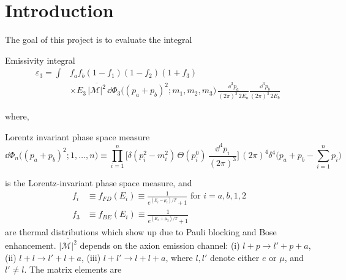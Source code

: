 \section{Introduction}
\label{sec:introduction}
The goal of this project is to evaluate the integral 

\begin{bluenv}{Emissivity integral}
    \begin{equation}
    \label{eq:emissivity-integral}
    \begin{aligned}
        \varepsilon_3 = \int 
            & f_a f_b (1 - f_1) (1 - f_2) (1 + f_3) \\
            &\times E_3 \,
            \overline{| \mathcal{M} |^2} \,
            \dd \Phi_3 \big( (p_a + p_b)^2; m_1, m_2, m_3 \big)
            \,
            \frac{\dd^3 p_a}{(2\pi)^3\,2 E_a}
            \frac{\dd^3 p_b}{(2\pi)^3\,2 E_b} 
            \; 
    \end{aligned}
    \end{equation}
\end{bluenv}
where, 
\begin{bluenv}{Lorentz invariant phase space measure}
    \begin{equation}
        \label{eq:LIPS}
        \dd \Phi_n \big((p_a + p_b)^2; 1, \ldots, n \big) \equiv 
        \prod_{i=1}^{n}
        \bigg[
             \delta (p_i^2 - m_i^2) \, \Theta(p_i^0) \, 
            \frac{\dd^4 p_i}{(2\pi)^3}
        \bigg] \, (2\pi)^4 \delta^4 
        \bigg( 
            p_a + p_b - \sum_{i=1}^{n} p_i
        \bigg) \quad 
    \end{equation}
\end{bluenv}
is the Lorentz-invariant phase space measure, and
\begin{align}
    f_i &\equiv f_{FD}(E_i) \equiv \frac{1}{e^{(E_i - \mu_i)/T} + 1} \text{ for } i = a, b, 1, 2 \label{eq:fermi-dirac}\\
    f_3 &\equiv f_{BE}(E_i) \equiv \frac{1}{e^{(E_3 + \mu_3)/T} + 1} \label{eq:bose-einstein}
\end{align}
are thermal distributions which show up due to Pauli blocking and Bose enhancement. 
$\overline{|\mathcal{M}|^2}$ depends on the axion emission channel: (i) $l + p \rightarrow l' + p + a$, (ii) $l + l \rightarrow l' + l + a$, (iii) $l + l' \rightarrow l + l + a$, where $l, l'$ denote either $e$ or $\mu$, and $l' \neq l$.
The matrix elements are
